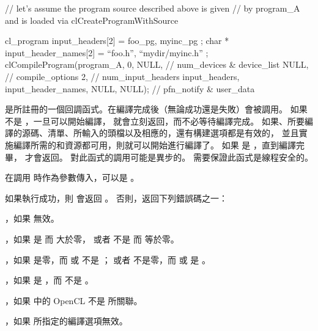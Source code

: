 // let’s assume the program source described above is given
// by program_A and is loaded via clCreateProgramWithSource

cl_program input_headers[2] = { foo_pg, myinc_pg };
char * input_header_names[2] = { “foo.h”, “mydir/myinc.h” };
clCompileProgram(program_A,
		0, NULL,	// num_devices & device_list
		NULL,		// compile_options
		2,		// num_input_headers
		input_headers,
		input_header_names,
		NULL, NULL);	// pfn_notify & user_data
\stopclc

 是所註冊的一個回調函式。在編譯完成後（無論成功還是失敗）會被調用。
如果  不是 ，一旦可以開始編譯，  就會立刻返回，而不必等待編譯完成。
如果、所要編譯的源碼、清單、所輸入的頭檔以及相應的，還有構建選項都是有效的，
並且實施編譯所需的和資源都可用，則就可以開始進行編譯了。
如果  是 ，直到編譯完畢，  才會返回。
對此函式的調用可能是異步的。
需要保證此函式是線程安全的。

 在調用  時作為參數傳入，可以是 。

如果執行成功，則  會返回 。
否則，返回下列錯誤碼之一：
\startigBase
\item {}，如果  無效。

\item {}，如果  是  而  大於零，
或者  不是  而  等於零。

\item {}，如果  是零，而  或  不是 ；
或者  不是零，而  或  是 。

\item {}，如果  是 ，而  不是 。

\item {}，如果  中的 OpenCL  不是  所關聯。

\item {}，如果  所指定的編譯選項無效。

